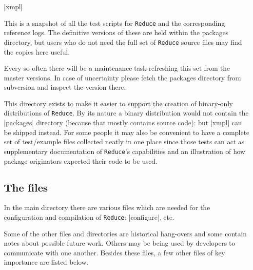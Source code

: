 \documentclass[12pt,twoside,openright]{memoir}
\newcommand{\reduce}{\texttt{Reduce}\xspace}
\begin{document}
\begin{description}
\item |xmpl|

This is a snapshot of all the test scripts for \reduce and the
corresponding reference logs. The definitive versions of these are
held within the packages directory, but users who do not need the
full set of \reduce source files may find the copies here useful.

Every so often there will be a maintenance task refreshing this set
from the master versions. In case of uncertainty please fetch the
packages directory from subversion and inspect the version there.

This directory exists to make it easier to support the creation of
binary-only distributions of \reduce. By its nature a binary distribution
would not contain the |packages| directory (because that mostly contains
source code): but |xmpl| can be shipped instead. For some people it
may also be convenient to have a complete set of test/example files
collected neatly in one place since those tests can act as supplementary
documentation of \reduce's capabilities and an illustration of how
package originators expected their code to be used.

\end{description}

\subsection{The files}

In the main directory there are various files which are needed for the
configuration and compilation of \reduce: |configure|, etc.

Some of the other files and directories are historical hang-overs and some
contain notes about possible future work. Others may be being used by developers
to communicate with one another.  Besides these files, a few other files
of key importance are listed below.
\end{document}
